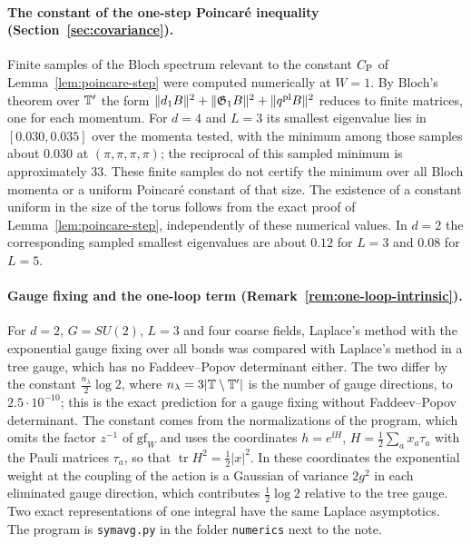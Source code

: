 \paragraph{The constant of the one-step Poincar\'e inequality (Section~\ref{sec:covariance}).}
Finite samples of the Bloch spectrum relevant to the constant $C_{\rm P}$ of Lemma~\ref{lem:poincare-step} were computed numerically at $W=1$. By Bloch's theorem over $\mathbb T'$ the form $\|d_1 B\|^2+\|\mathfrak G_1B\|^2+\|q^{\rm pl}B\|^2$ reduces to finite matrices, one for each momentum. For $d=4$ and $L=3$ its smallest eigenvalue lies in $[0.030,0.035]$ over the momenta tested, with the minimum among those samples about $0.030$ at $(\pi,\pi,\pi,\pi)$; the reciprocal of this sampled minimum is approximately $33$. These finite samples do not certify the minimum over all Bloch momenta or a uniform Poincar\'e constant of that size. The existence of a constant uniform in the size of the torus follows from the exact proof of Lemma~\ref{lem:poincare-step}, independently of these numerical values. In $d=2$ the corresponding sampled smallest eigenvalues are about $0.12$ for $L=3$ and $0.08$ for $L=5$.

\paragraph{Gauge fixing and the one-loop term (Remark~\ref{rem:one-loop-intrinsic}).}
For $d=2$, $G=SU(2)$, $L=3$ and four coarse fields, Laplace's method with the exponential gauge fixing over all bonds was compared with Laplace's method in a tree gauge, which has no Faddeev--Popov determinant either. The two differ by the constant $\frac{n_\lambda}2\log2$, where $n_\lambda=3|\mathbb T\setminus\mathbb T'|$ is the number of gauge directions, to $2.5\cdot10^{-10}$; this is the exact prediction for a gauge fixing without Faddeev--Popov determinant. The constant comes from the normalizations of the program, which omits the factor $z^{-1}$ of $\mathrm{gf}_W$ and uses the coordinates $h=e^{\ii H}$, $H=\frac12\sum_ax_a\tau_a$ with the Pauli matrices $\tau_a$, so that $\operatorname{tr}H^2=\frac12|x|^2$. In these coordinates the exponential weight at the coupling of the action is a Gaussian of variance $2g^2$ in each eliminated gauge direction, which contributes $\frac12\log2$ relative to the tree gauge. Two exact representations of one integral have the same Laplace asymptotics. The program is \texttt{symavg.py} in the folder \texttt{numerics} next to the note.

